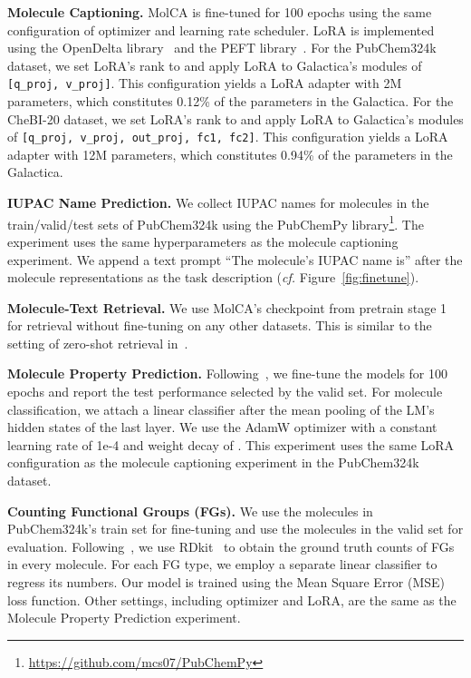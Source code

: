 \documentclass[11pt]{article}
\newcommand{\cf}{\emph{cf. }}
\begin{document}
\textbf{Molecule Captioning.} MolCA is fine-tuned for 100 epochs using the same configuration of optimizer and learning rate scheduler. LoRA is implemented using the OpenDelta library~\cite{OpenDelta} and the PEFT library~\citep{peft}. For the PubChem324k dataset, we set LoRA's rank  to  and apply LoRA to Galactica's modules of \texttt{[q\_proj, v\_proj]}. This configuration yields a LoRA adapter with 2M parameters, which constitutes 0.12\% of the parameters in the Galactica. For the CheBI-20 dataset, we set LoRA's rank  to  and apply LoRA to Galactica's modules of \texttt{[q\_proj, v\_proj, out\_proj, fc1, fc2]}. This configuration yields a LoRA adapter with 12M parameters, which constitutes 0.94\% of the parameters in the Galactica.


\textbf{IUPAC Name Prediction.} We collect IUPAC names for molecules in the train/valid/test sets of PubChem324k using the PubChemPy library\footnote{\url{https://github.com/mcs07/PubChemPy}}. The experiment uses the same hyperparameters as the molecule captioning experiment. We append a text prompt ``The molecule's IUPAC name is'' after the molecule representations as the task description (\cf Figure~\ref{fig:finetune}). 

\textbf{Molecule-Text Retrieval.} We use MolCA's checkpoint from pretrain stage 1 for retrieval without fine-tuning on any other datasets. This is similar to the setting of zero-shot retrieval in~\cite{MoMu, MoleculeSTM}.


\textbf{Molecule Property Prediction.} Following~\cite{pretrain_gnn}, we fine-tune the models for 100 epochs and report the test performance selected by the valid set. For molecule classification, we attach a linear classifier after the mean pooling of the LM's hidden states of the last layer. We use the AdamW optimizer with a constant learning rate of 1e-4 and weight decay of . This experiment uses the same LoRA configuration as the molecule captioning experiment in the PubChem324k dataset.

\textbf{Counting Functional Groups (FGs).} We use the molecules in PubChem324k's train set for fine-tuning and use the molecules in the valid set for evaluation.
Following~\cite{Grover}, we use RDkit~\cite{rdkit} to obtain the ground truth counts of FGs in every molecule. For each FG type, we employ a separate linear classifier to regress its numbers. Our model is trained using the Mean Square Error (MSE) loss function. Other settings, including optimizer and LoRA, are the same as the Molecule Property Prediction experiment.
\end{document}
